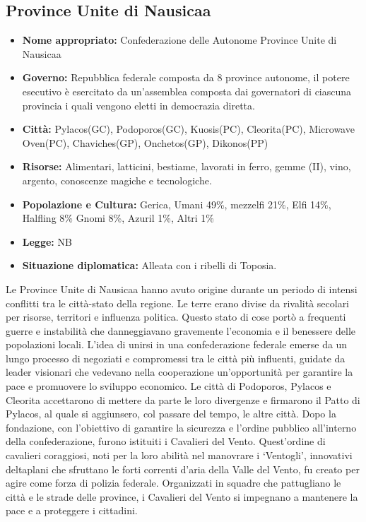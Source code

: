 \documentclass[a4paper]{report}
\begin{document}
\begin{multicols}{2}
\subsection*{Province Unite di Nausicaa}
\begin{itemize}
	\item \textbf{Nome appropriato:} Confederazione delle Autonome Province Unite di Nausicaa
	\item \textbf{Governo:} Repubblica federale composta da 8 province autonome, il potere esecutivo è esercitato da un'assemblea composta dai governatori di ciascuna provincia i quali vengono eletti in democrazia diretta. 
	\item \textbf{Città:} Pylacos(GC), Podoporos(GC), Kuosis(PC), Cleorita(PC), Microwave Oven(PC), Chaviches(GP), Onchetos(GP), Dikonos(PP)
	\item \textbf{Risorse:} Alimentari, latticini, bestiame, lavorati in ferro, gemme (II), vino, argento, conoscenze magiche e tecnologiche.
	\item \textbf{Popolazione e Cultura:} Gerica, Umani 49\%, mezzelfi 21\%, Elfi 14\%, Halfling 8\% Gnomi 8\%, Azuril 1\%, Altri 1\%
	\item \textbf{Legge:} NB
	\item \textbf{Situazione diplomatica:} Alleata con i ribelli di Toposia.
\end{itemize}
Le Province Unite di Nausicaa hanno avuto origine durante un periodo di intensi conflitti tra le città-stato della regione. Le terre erano divise da rivalità secolari per risorse, territori e influenza politica. Questo stato di cose portò a frequenti guerre e instabilità che danneggiavano gravemente l'economia e il benessere delle popolazioni locali. L'idea di unirsi in una confederazione federale emerse da un lungo processo di negoziati e compromessi tra le città più influenti, guidate da leader visionari che vedevano nella cooperazione un'opportunità per garantire la pace e promuovere lo sviluppo economico. Le città di Podoporos, Pylacos e Cleorita accettarono di mettere da parte le loro divergenze e firmarono il Patto di Pylacos, al quale si aggiunsero, col passare del tempo, le altre città. Dopo la fondazione, con l'obiettivo di garantire la sicurezza e l'ordine pubblico all'interno della confederazione, furono istituiti i Cavalieri del Vento. Quest'ordine di cavalieri coraggiosi, noti per la loro abilità nel manovrare i \enquote*{Ventogli}, innovativi deltaplani che sfruttano le forti correnti d'aria della Valle del Vento, fu creato per agire come forza di polizia federale. Organizzati in squadre che pattugliano le città e le strade delle province, i Cavalieri del Vento si impegnano a mantenere la pace e a proteggere i cittadini.


\end{multicols}
\end{document}
